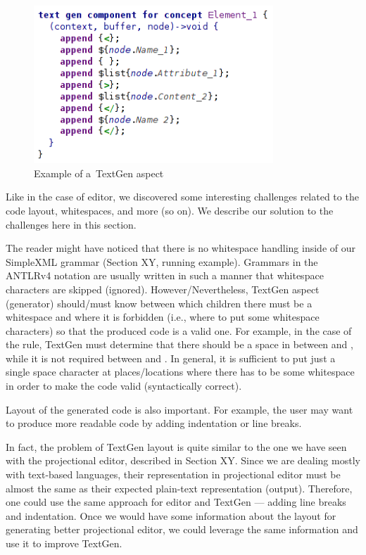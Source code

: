 \begin{figure}[ht]
	\centering
	\includegraphics[width=90mm]{./images/textgen_example.png}
	\caption{Example of a~TextGen aspect}
	\label{fig:textgen_example}
\end{figure}

Like in the case of editor, we discovered some interesting challenges related to the code layout, whitespaces, and more (so on).
We describe our solution to the challenges here in this section.

The reader might have noticed that there is no whitespace handling inside of our SimpleXML grammar (Section XY, running example).
Grammars in the ANTLRv4 notation are usually written in such a manner that whitespace characters are skipped (ignored).
However/Nevertheless, TextGen aspect (generator) should/must know between which children there must be a whitespace and where it is forbidden (i.e., where to put some whitespace characters) so that the produced code is a valid one.
For example, in the case of the  rule, TextGen must determine that there should be a space in between  and , while it is not required between \antlrliteral{\textless} and .
In general, it is sufficient to put just a single space character at places/locations where there has to be some whitespace in order to make the code valid (syntactically correct).

Layout of the generated code is also important. For example, the user may want to produce more readable code by adding indentation or line breaks.

In fact, the problem of TextGen layout is quite similar to the one we have seen with the projectional editor, described in Section XY.
Since we are dealing mostly with text-based languages, their representation in projectional editor must be almost the same as their expected plain-text representation (output).
Therefore, one could use the same approach for editor and TextGen --- adding line breaks and indentation.
Once we would have some information about the layout for generating better projectional editor, we could leverage the same information and use it to improve TextGen.

